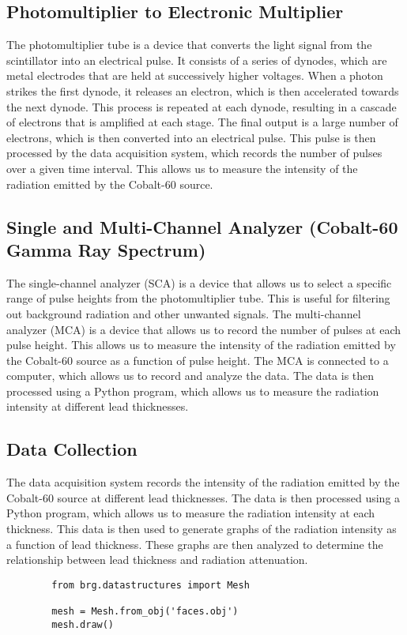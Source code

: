 \documentclass[12pt]{article}
\begin{document}
    \subsection{Photomultiplier to Electronic Multiplier}
        The photomultiplier tube is a device that converts the light signal from the scintillator into an electrical pulse. 
        It consists of a series of dynodes, which are metal electrodes that are held at successively higher voltages. 
        When a photon strikes the first dynode, it releases an electron, which is then accelerated towards the next dynode. 
        This process is repeated at each dynode, resulting in a cascade of electrons that is amplified at each stage. 
        The final output is a large number of electrons, which is then converted into an electrical pulse. 
        This pulse is then processed by the data acquisition system, which records the number of pulses over a given time interval. 
        This allows us to measure the intensity of the radiation emitted by the Cobalt-60 source.
        
    \subsection{Single and Multi-Channel Analyzer (Cobalt-60 Gamma Ray Spectrum)}
        The single-channel analyzer (SCA) is a device that allows us to select a specific range of pulse heights from the photomultiplier tube. 
        This is useful for filtering out background radiation and other unwanted signals. 
        The multi-channel analyzer (MCA) is a device that allows us to record the number of pulses at each pulse height. 
        This allows us to measure the intensity of the radiation emitted by the Cobalt-60 source as a function of pulse height. 
        The MCA is connected to a computer, which allows us to record and analyze the data. 
        The data is then processed using a Python program, which allows us to measure the radiation intensity at different lead thicknesses.
        
    \subsection{Data Collection}
        The data acquisition system records the intensity of the radiation emitted by the Cobalt-60 source at different lead thicknesses. 
        The data is then processed using a Python program, which allows us to measure the radiation intensity at each thickness. 
        This data is then used to generate graphs of the radiation intensity as a function of lead thickness. 
        These graphs are then analyzed to determine the relationship between lead thickness and radiation attenuation.
        \lstset{language=Python}
        \lstset{frame=lines}
        \lstset{basicstyle=\footnotesize}
        \begin{lstlisting}
        from brg.datastructures import Mesh
        
        mesh = Mesh.from_obj('faces.obj')
        mesh.draw()
        \end{lstlisting}
                
\end{document}
